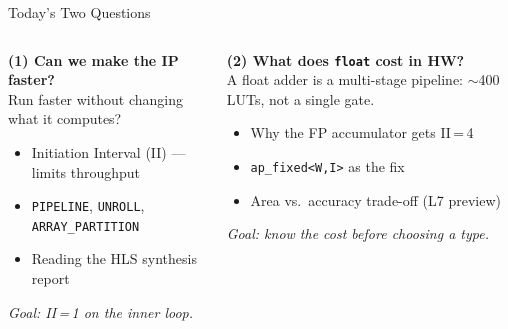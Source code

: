 \documentclass[aspectratio=169,12pt]{beamer}
\begin{document}
\begin{frame}[t]{Today's Two Questions}
\vspace{0.15cm}
\begin{columns}[T,totalwidth=\textwidth]

  \colorbox{Orange!10}{\parbox{\dimexpr\linewidth-2\fboxsep\relax}{%
    \vspace{3pt}
    {\color{Orange}\bfseries (1) Can we make the IP faster?}\\[3pt]
    {\small Run faster without changing what it computes?}\\[4pt]
    {\small\color{Navy}
    \begin{itemize}\setlength{\itemsep}{1pt}
      \item Initiation Interval (II) — limits throughput
      \item \texttt{PIPELINE}, \texttt{UNROLL}, \texttt{ARRAY\_PARTITION}
      \item Reading the HLS synthesis report
    \end{itemize}}
    \vspace{2pt}
    {\small\itshape\color{MidGray}Goal: II\,=\,1 on the inner loop.}
    \vspace{3pt}
  }}


  \colorbox{Teal!10}{\parbox{\dimexpr\linewidth-2\fboxsep\relax}{%
    \vspace{3pt}
    {\color{Teal}\bfseries (2) What does \texttt{float} cost in HW?}\\[3pt]
    {\small A float adder is a multi-stage pipeline: $\sim$400\,LUTs, not a single gate.}\\[4pt]
    {\small\color{Navy}
    \begin{itemize}\setlength{\itemsep}{1pt}
      \item Why the FP accumulator gets II\,=\,4
      \item \texttt{ap\_fixed<W,I>} as the fix
      \item Area vs.\ accuracy trade-off (L7 preview)
    \end{itemize}}
    \vspace{2pt}
    {\small\itshape\color{MidGray}Goal: know the cost before choosing a type.}
    \vspace{3pt}
  }}

\end{columns}
\end{frame}
\end{document}
